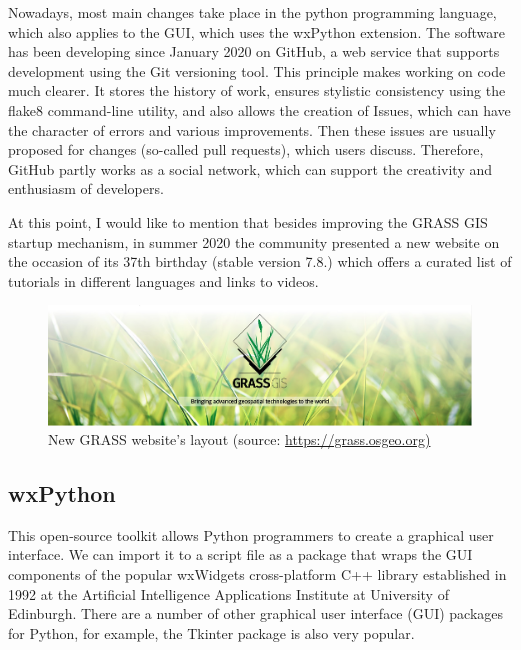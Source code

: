 \documentclass[a4paper,10pt,twoside]{article}
\begin{document}
Nowadays, most main changes take place in the python programming language, which also applies to the GUI, which uses the wxPython extension. The software has been developing since January 2020 on GitHub, a web service that supports development using the Git versioning tool. This principle makes working on code much clearer. It stores the history of work, ensures stylistic consistency using the flake8 command-line utility, and also allows the creation of Issues, which can have the character of errors and various improvements. Then these issues are usually proposed for changes (so-called pull requests), which users discuss. Therefore, GitHub partly works as a social network, which can support the creativity and enthusiasm of developers.

At this point, I would like to mention that besides improving the GRASS GIS startup mechanism, in summer 2020 the community presented a new website on the occasion of its 37th birthday (stable version 7.8.) which offers a curated list of tutorials in different languages and links to videos.

\vspace{0.3cm}
\begin{figure}[hbt!]
\begin{center}
\includegraphics[width=15cm]{../pictures/grass_gis.png} 
\caption[New GRASS website's layout]{New GRASS website's layout (source: \url{https://grass.osgeo.org)}}
\label{fig:grass_gis}
\end{center}
\end{figure}

\subsection{wxPython}
\noindent
\large

\noindent This open-source toolkit allows Python programmers to create a graphical user interface. We can import it to a script file as a package that wraps the GUI components of the popular wxWidgets cross-platform C++ library established in 1992 at the Artificial Intelligence Applications Institute at University of Edinburgh. There are a number of other graphical user interface (GUI) packages for Python, for example, the Tkinter package is also very popular.
\end{document}
